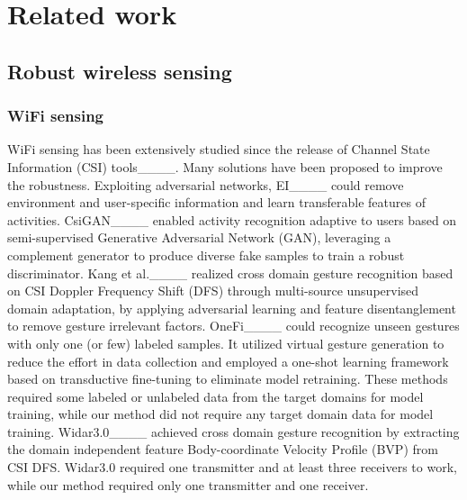 \section{Related work}
\label{SecRelatedWork}

\subsection{Robust wireless sensing}
\subsubsection{WiFi sensing}
WiFi sensing has been extensively studied since the release of Channel State Information (CSI) tools____. Many solutions have been proposed to improve the robustness. 
Exploiting adversarial networks, EI____ could remove environment and user-specific information and learn transferable features of activities. 
CsiGAN____ enabled activity recognition adaptive to users based on semi-supervised Generative Adversarial Network (GAN), leveraging a complement generator to produce diverse fake samples to train a robust discriminator.
Kang et al.____ realized cross domain gesture recognition based on CSI Doppler Frequency Shift (DFS) through multi-source unsupervised domain adaptation, by applying adversarial learning and feature disentanglement to remove gesture irrelevant factors. 
OneFi____ could recognize unseen gestures with only one (or few) labeled samples. It utilized virtual gesture generation to reduce the effort in data collection and employed a one-shot learning framework based on transductive fine-tuning to eliminate model retraining. 
These methods required some labeled or unlabeled data from the target domains for model training, while our method did not require any target domain data for model training.
Widar3.0____ achieved cross domain gesture recognition by extracting the domain independent feature Body-coordinate Velocity Profile (BVP) from CSI DFS. Widar3.0 required one transmitter and at least three receivers to work, while our method required only one transmitter and one receiver.  


